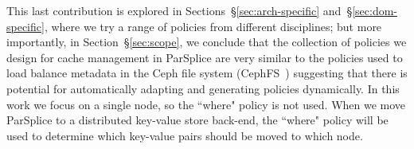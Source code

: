 
This last contribution is explored in Sections~\S\ref{sec:arch-specific}
and~\S\ref{sec:dom-specific}, where we try a range of policies from different
disciplines; but more importantly, in Section~\S\ref{sec:scope}, we conclude
that the collection of policies we design for cache management in ParSplice are
very similar to the policies used to load balance metadata in the Ceph file
system (CephFS~\cite{weil:osdi2006-ceph}) suggesting that there is potential
for automatically adapting and generating policies dynamically.  In this work
we focus on a single node, so the ``where" policy is not used. When we move
ParSplice to a distributed key-value store back-end, the ``where" policy will
be used to determine which key-value pairs should be moved to which node.




